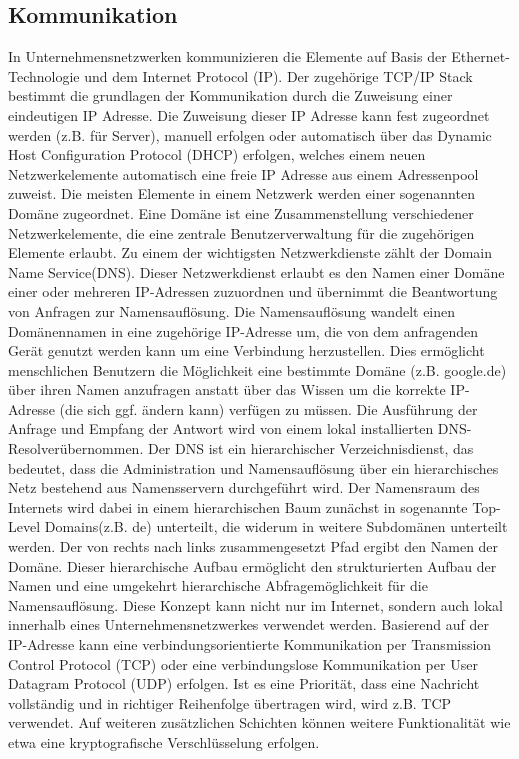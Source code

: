\subsection{Kommunikation}
In Unternehmensnetzwerken kommunizieren die Elemente auf Basis der Ethernet-Technologie und dem Internet Protocol (IP). Der zugehörige TCP/IP Stack bestimmt die grundlagen der Kommunikation durch die Zuweisung einer eindeutigen IP Adresse. Die Zuweisung dieser IP Adresse kann fest zugeordnet werden (z.B. für Server), manuell erfolgen oder automatisch über das Dynamic Host Configuration Protocol (DHCP) erfolgen, welches einem neuen Netzwerkelemente automatisch eine freie IP Adresse aus einem Adressenpool zuweist. Die meisten Elemente in einem Netzwerk werden einer sogenannten Domäne zugeordnet. Eine Domäne ist eine Zusammenstellung verschiedener Netzwerkelemente, die eine zentrale Benutzerverwaltung für die zugehörigen Elemente erlaubt. 
Zu einem der wichtigsten Netzwerkdienste zählt der \glqq Domain Name Service\grqq  (DNS). Dieser Netzwerkdienst erlaubt es den Namen einer Domäne einer oder mehreren IP-Adressen zuzuordnen und übernimmt die Beantwortung von Anfragen zur Namensauflösung. Die Namensauflösung wandelt einen Domänennamen in eine zugehörige IP-Adresse um, die von dem anfragenden Gerät genutzt werden kann um eine Verbindung herzustellen. Dies ermöglicht menschlichen Benutzern die Möglichkeit eine bestimmte Domäne (z.B. \glqq google.de\grqq ) über ihren Namen anzufragen anstatt über das Wissen um die korrekte IP-Adresse (die sich ggf. ändern kann) verfügen zu müssen. Die Ausführung der Anfrage und Empfang der Antwort wird von einem lokal installierten \glqq DNS-Resolver\grqq  übernommen. Der DNS ist ein hierarchischer Verzeichnisdienst, das bedeutet, dass die Administration und Namensauflösung über ein hierarchisches Netz bestehend aus Namensservern durchgeführt wird. Der Namensraum des Internets wird dabei in einem hierarchischen Baum zunächst in sogenannte \glqq Top-Level Domains\grqq  (z.B. \glqq de\grqq ) unterteilt, die widerum in weitere Subdomänen unterteilt werden. Der von rechts nach links zusammengesetzt Pfad ergibt den Namen der Domäne. Dieser hierarchische Aufbau ermöglicht den strukturierten Aufbau der Namen und eine umgekehrt hierarchische Abfragemöglichkeit für die Namensauflösung. Diese Konzept kann nicht nur im Internet, sondern auch lokal innerhalb eines Unternehmensnetzwerkes verwendet werden.
Basierend auf der IP-Adresse kann eine verbindungsorientierte Kommunikation per Transmission Control Protocol (TCP) oder eine verbindungslose Kommunikation per User Datagram Protocol (UDP) erfolgen.  Ist es eine Priorität, dass eine Nachricht vollständig und in richtiger Reihenfolge übertragen wird, wird z.B. TCP verwendet. Auf weiteren zusätzlichen Schichten können weitere Funktionalität wie etwa eine kryptografische Verschlüsselung erfolgen. 

